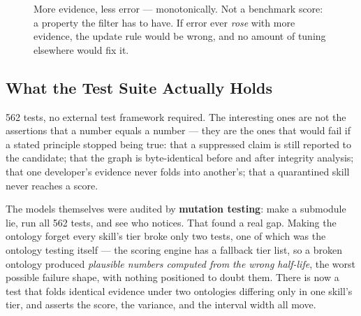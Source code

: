 \documentclass[11pt,a4paper]{article}
\begin{document}
\begin{figure}[H]
\centering
{}
\caption{More evidence, less error --- monotonically. Not a benchmark
score: a property the filter has to have. If error ever \emph{rose} with
more evidence, the update rule would be wrong, and no amount of tuning
elsewhere would fix it.}
\label{fig:rmse}
\end{figure}

\subsection*{What the Test Suite Actually Holds}

562 tests, no external test framework required. The interesting ones are
not the assertions that a number equals a number --- they are the ones that
would fail if a stated principle stopped being true: that a suppressed
claim is still reported to the candidate; that the graph is byte-identical
before and after integrity analysis; that one developer's evidence never
folds into another's; that a quarantined skill never reaches a score.

The models themselves were audited by \textbf{mutation testing}: make a
submodule lie, run all 562 tests, and see who notices. That found a real
gap. Making the ontology forget every skill's tier broke only two tests,
one of which was the ontology testing itself --- the scoring engine has a
fallback tier list, so a broken ontology produced \emph{plausible numbers
computed from the wrong half-life}, the worst possible failure shape, with
nothing positioned to doubt them. There is now a test that folds identical
evidence under two ontologies differing only in one skill's tier, and
asserts the score, the variance, and the interval width all move.
\end{document}
